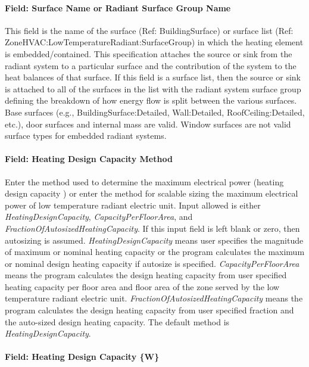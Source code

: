 \paragraph{Field: Surface Name or Radiant Surface Group Name}\label{field-surface-name-or-radiant-surface-group-name-2}

This field is the name of the surface (Ref: BuildingSurface) or surface list (Ref: ZoneHVAC:LowTemperatureRadiant:SurfaceGroup) in which the heating element is embedded/contained. This specification attaches the source or sink from the radiant system to a particular surface and the contribution of the system to the heat balances of that surface. If this field is a surface list, then the source or sink is attached to all of the surfaces in the list with the radiant system surface group defining the breakdown of how energy flow is split between the various surfaces. Base surfaces (e.g., BuildingSurface:Detailed, Wall:Detailed, RoofCeiling:Detailed, etc.), door surfaces and internal mass are valid. Window surfaces are not valid surface types for embedded radiant systems.

\paragraph{Field: Heating Design Capacity Method}\label{field-heating-design-capacity-method-6}

Enter the method used to determine the maximum electrical power (heating design capacity ) or enter the method for scalable sizing the maximum electrical power of low temperature radiant electric unit. Input allowed is either \emph{HeatingDesignCapacity}, \emph{CapacityPerFloorArea}, and \emph{FractionOfAutosizedHeatingCapacity}. If this input field is left blank or zero, then autosizing is assumed. \emph{HeatingDesignCapacity} means user specifies the magnitude of maximum or nominal heating capacity or the program calculates the maximum or nominal design heating capacity if autosize is specified. \emph{CapacityPerFloorArea} means the program calculates the design heating capacity from user specified heating capacity per floor area and floor area of the zone served by the low temperature radiant electric unit. \emph{FractionOfAutosizedHeatingCapacity} means the program calculates the design heating capacity from user specified fraction and the auto-sized design heating capacity. The default method is \emph{HeatingDesignCapacity}.

\paragraph{Field: Heating Design Capacity \{W\}}\label{field-heating-design-capacity-w-6}

